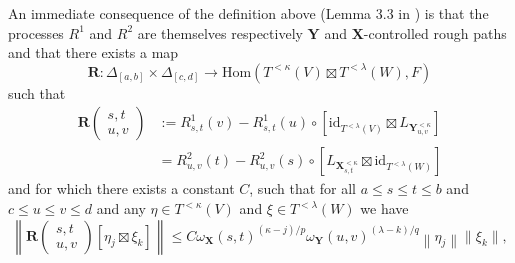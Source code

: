 \documentclass{article}%
\begin{document}

An immediate consequence of the definition above (Lemma 3.3 in \cite{cass2023fubini}) is that the processes $R^1$ and $R^2$ are themselves respectively $\mathbf{Y}$
and $\mathbf{X}$-controlled rough paths and that there exists a map 
\[
\mathbf{R}: \Delta_{[a,b]} \times \Delta_{[c,d]} \rightarrow \mathrm{Hom}\left(
T^{<\kappa}\left(  V\right)  \boxtimes T^{<\lambda}\left(  W\right)
,F\right) 
\]
such that 
\begin{align*}
\mathbf{R} \begin{pmatrix} s,t \\ u,v \end{pmatrix} &:= R^1_{s,t}(v) - R^1_{s,t}(u) \circ\left[ \text{id}_{T^{<\lambda}\left(  V\right)}  \boxtimes  L_{\mathbf{Y}_{u,v}^{<\kappa}
 }\right] \\
    &= R^2_{u,v}(t) - R^2_{u,v}(s) \circ\left[    L_{\mathbf{X}_{s,t}^{<\kappa}}\boxtimes  \text{id}_{T^{<\lambda}\left(  W\right)
 }\right]
\end{align*}
and for which there exists a constant $C$, such that for all $a \le s \le t \le b$ and $c \le u \le v \le d$ and any $\eta\in
T^{<\kappa}\left(  V\right)  $ and $\xi\in T^{<\lambda}\left(  W\right)  $ we
have
\begin{equation}\label{remainder_remainder_norm}
\left\| \mathbf{R} \begin{pmatrix} s,t \\ u,v \end{pmatrix} [\eta_j \boxtimes \xi_k] \right\| \leq C \omega_{\mathbf{X}}\left(
s,t\right)  ^{\left(  \kappa-j\right)  /p} \omega_{\mathbf{Y}}\left(
u,v\right)  ^{\left(  \lambda-k\right)  /q}\left \| \eta_{j}%
\right \| \| \xi_k \|,
\end{equation}
\end{document}

